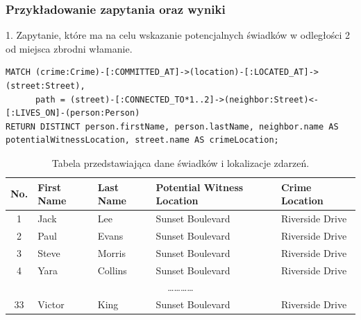 \documentclass[a4paper,12pt]{article}
\begin{document}
\subsubsection{Przykładowanie zapytania oraz wyniki}

1. Zapytanie, które ma na celu wskazanie potencjalnych świadków w odległości 2 od miejsca zbrodni włamanie.

\begin{center}
\begin{minipage}{0.8\linewidth}
\begin{lstlisting}[language=Cypher, basicstyle=\small, breaklines=true]
MATCH (crime:Crime)-[:COMMITTED_AT]->(location)-[:LOCATED_AT]->(street:Street),
      path = (street)-[:CONNECTED_TO*1..2]->(neighbor:Street)<-[:LIVES_ON]-(person:Person)
RETURN DISTINCT person.firstName, person.lastName, neighbor.name AS potentialWitnessLocation, street.name AS crimeLocation;
\end{lstlisting}
\end{minipage}
\end{center}

\begin{table}[h!]
\centering
\begin{tabular}{|c|l|l|l|l|}
\hline
\textbf{No.} & \textbf{First Name} & \textbf{Last Name} & \textbf{Potential Witness Location} & \textbf{Crime Location} \\ \hline
1            & Jack                & Lee                & Sunset Boulevard                   & Riverside Drive          \\ \hline
2            & Paul                & Evans              & Sunset Boulevard                   & Riverside Drive          \\ \hline
3            & Steve               & Morris             & Sunset Boulevard                   & Riverside Drive          \\ \hline
4            & Yara                & Collins            & Sunset Boulevard                   & Riverside Drive          \\ \hline
\multicolumn{5}{|c|}{\dots\dots\dots\dots} \\ \hline
33           & Victor              & King               & Sunset Boulevard                   & Riverside Drive          \\ \hline
\end{tabular}
\caption{Tabela przedstawiająca dane świadków i lokalizacje zdarzeń.}
\label{tab:witness_data}
\end{table}
\end{document}
